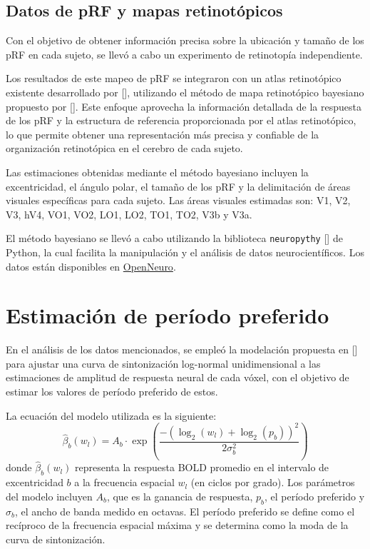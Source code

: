 \subsection{Datos de pRF y mapas retinot\'opicos}

Con el objetivo de obtener información precisa sobre la ubicación y tamaño de los pRF en cada sujeto, se llevó a cabo un experimento de retinotopía independiente. 

Los resultados de este mapeo de pRF se integraron con un atlas retinotópico existente desarrollado por [\cite{benson_retinotopic_2012}], utilizando el método de mapa retinotópico bayesiano propuesto por [\cite{benson_human_2018}]. Este enfoque aprovecha la información detallada de la respuesta de los pRF y la estructura de referencia proporcionada por el atlas retinotópico, lo que permite obtener una representación más precisa y confiable de la organización retinotópica en el cerebro de cada sujeto.

Las estimaciones obtenidas mediante el método bayesiano incluyen la excentricidad, el ángulo polar, el tamaño de los pRF y la delimitación de áreas visuales específicas para cada sujeto. Las áreas visuales estimadas son: V1, V2, V3, hV4, VO1, VO2, LO1, LO2, TO1, TO2, V3b y V3a.

El método bayesiano se llevó a cabo utilizando la biblioteca \texttt{neuropythy} [\cite{benson_human_2018}] de Python, la cual facilita la manipulación y el análisis de datos neurocientíficos. Los datos est\'an disponibles en \href{https://openneuro.org/datasets/ds003812/versions/1.1.0}{OpenNeuro}.


\section{Estimaci\'on de per\'iodo preferido}

En el análisis de los datos mencionados, se empleó la modelación propuesta en [\cite{broderick_mapping_2022}] para ajustar una curva de sintonización log-normal unidimensional a las estimaciones de amplitud de respuesta neural de cada v\'oxel, con el objetivo de estimar los valores de período preferido de estos.

La ecuación del modelo utilizada es la siguiente:
\begin{equation}
\hat{\beta}_b(w_l) = A_b \cdot \exp\left(\frac{-(\log_2(w_l) + \log_2(p_b))^2}{2\sigma_b^2}\right)
\end{equation}
donde \(\hat{\beta}_b(w_l)\) representa la respuesta BOLD promedio en el intervalo de excentricidad \(b\) a la frecuencia espacial \(w_l\) (en ciclos por grado). Los parámetros del modelo incluyen \(A_b\), que es la ganancia de respuesta, \(p_b\), el per\'iodo preferido y \(\sigma_b\), el ancho de banda medido en octavas. El período preferido se define como el recíproco de la frecuencia espacial máxima y se determina como la moda de la curva de sintonización.

